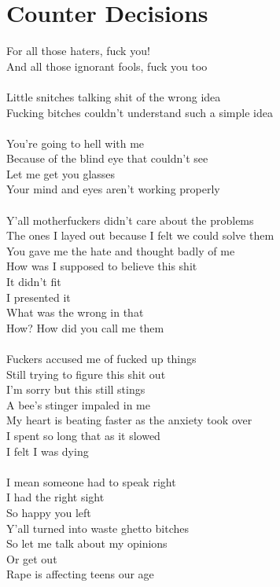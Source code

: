\documentclass[12pt, b5paper, oneside]{book}
\begin{document}
\section{Counter Decisions}
For all those haters, fuck you!
\\And all those ignorant fools, fuck you too
%
\\\\Little snitches talking shit of the wrong idea
\\Fucking bitches couldn't understand such a simple idea
%
\\\\You're going to hell with me
\\Because of the blind eye that couldn't see
\\Let me get you glasses
\\Your mind and eyes aren't working properly
%
\\\\Y'all motherfuckers didn't care about the problems
\\The ones I layed out because I felt we could solve them
\\You gave me the hate and thought badly of me
\\How was I supposed to believe this shit
\\It didn't fit
\\I presented it
\\What was the wrong in that
\\How? How did you call me them
%
\\\\Fuckers accused me of fucked up things
\\Still trying to figure this shit out
\\I'm sorry but this still stings
\\A bee's stinger impaled in me
\\My heart is beating faster as the anxiety took over
\\I spent so long that as it slowed
\\I felt I was dying
%
\\\\I mean someone had to speak right
\\I had the right sight
\\So happy you left
\\Y'all turned into waste ghetto bitches
\\So let me talk about my opinions
\\Or get out
\\Rape is affecting teens our age
\end{document}
